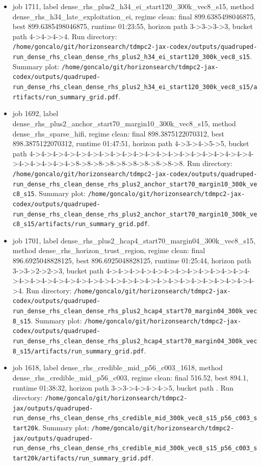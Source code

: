 \begin{itemize}
\item job 1711, label dense\_rhs\_plus2\_h34\_ei\_start120\_300k\_vec8\_s15, method dense\_rhs\_h34\_late\_exploitation\_ei, regime clean: final 899.6385498046875, best 899.6385498046875, runtime 01:23:55, horizon path 3->3->3->3, bucket path 4->4->4->4. Run directory: \texttt{/home/goncalo/git/horizonsearch/tdmpc2-jax-codex/outputs/quadruped-run\_dense\_rhs\_clean\_dense\_rhs\_plus2\_h34\_ei\_start120\_300k\_vec8\_s15}. Summary plot: \texttt{/home/goncalo/git/horizonsearch/tdmpc2-jax-codex/outputs/quadruped-run\_dense\_rhs\_clean\_dense\_rhs\_plus2\_h34\_ei\_start120\_300k\_vec8\_s15/artifacts/run\_summary\_grid.pdf}.
\item job 1692, label dense\_rhs\_plus2\_anchor\_start70\_margin10\_300k\_vec8\_s15, method dense\_rhs\_sparse\_hifi, regime clean: final 898.3875122070312, best 898.3875122070312, runtime 01:47:51, horizon path 4->3->4->5->5, bucket path 4->4->4->4->4->4->4->4->4->4->4->4->4->4->4->4->4->4->4->4->4->4->4->4->4->8->8->8->8->8->8->8->8->8->8. Run directory: \texttt{/home/goncalo/git/horizonsearch/tdmpc2-jax-codex/outputs/quadruped-run\_dense\_rhs\_clean\_dense\_rhs\_plus2\_anchor\_start70\_margin10\_300k\_vec8\_s15}. Summary plot: \texttt{/home/goncalo/git/horizonsearch/tdmpc2-jax-codex/outputs/quadruped-run\_dense\_rhs\_clean\_dense\_rhs\_plus2\_anchor\_start70\_margin10\_300k\_vec8\_s15/artifacts/run\_summary\_grid.pdf}.
\item job 1701, label dense\_rhs\_plus2\_hcap4\_start70\_margin04\_300k\_vec8\_s15, method dense\_rhs\_horizon\_trust\_region, regime clean: final 896.6925048828125, best 896.6925048828125, runtime 01:25:44, horizon path 3->3->2->2->3, bucket path 4->4->4->4->4->4->4->4->4->4->4->4->4->4->4->4->4->4->4->4->4->4->4->4->4->4->4->4->4->4->4->4->4->4->4. Run directory: \texttt{/home/goncalo/git/horizonsearch/tdmpc2-jax-codex/outputs/quadruped-run\_dense\_rhs\_clean\_dense\_rhs\_plus2\_hcap4\_start70\_margin04\_300k\_vec8\_s15}. Summary plot: \texttt{/home/goncalo/git/horizonsearch/tdmpc2-jax-codex/outputs/quadruped-run\_dense\_rhs\_clean\_dense\_rhs\_plus2\_hcap4\_start70\_margin04\_300k\_vec8\_s15/artifacts/run\_summary\_grid.pdf}.
\item job 1618, label dense\_rhs\_credible\_mid\_p56\_c003\_1618, method dense\_rhs\_credible\_mid\_p56\_c003, regime clean: final 516.52, best 894.1, runtime 01:38:32, horizon path 3->3->4->4->4->5, bucket path . Run directory: \texttt{/home/goncalo/git/horizonsearch/tdmpc2-jax/outputs/quadruped-run\_dense\_rhs\_clean\_dense\_rhs\_credible\_mid\_300k\_vec8\_s15\_p56\_c003\_start20k}. Summary plot: \texttt{/home/goncalo/git/horizonsearch/tdmpc2-jax/outputs/quadruped-run\_dense\_rhs\_clean\_dense\_rhs\_credible\_mid\_300k\_vec8\_s15\_p56\_c003\_start20k/artifacts/run\_summary\_grid.pdf}.

\end{itemize}
